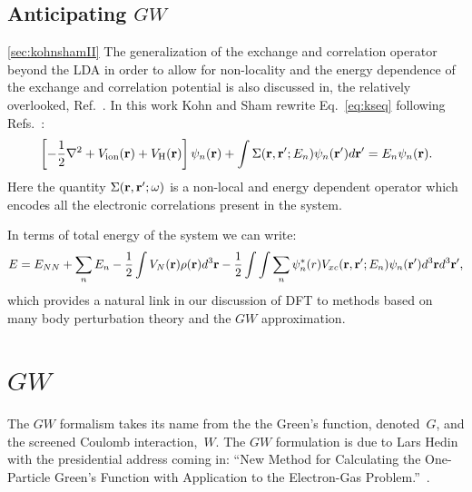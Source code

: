 \subsection{Anticipating $GW$}
\ref{sec:kohnshamII}
The generalization of the exchange and correlation operator beyond the LDA 
in order to allow for non-locality and the energy dependence of the exchange and
correlation potential is also discussed in, the relatively overlooked, Ref.~\cite{shamkohn66}. 
In this work Kohn and Sham rewrite Eq.~\ref{eq:kseq} following Refs.~\cite{schwinger51, hedin65}:
%
\begin{equation}
\label{eq:qpeq}
\left[-\frac{1}{2}\nabla^{2} + V_{\rm{ion}}({\bf r}) + V_{\rm{H}}({\bf r})\right]\psi_{n}({\bf r}) + \int \Sigma({\bf r},{\bf r}';E_{n})\psi_{n}({\bf r}') d{\bf r}' = E_{n}\psi_{n}({\bf r}).
\end{equation}
%
Here the quantity $\Sigma({\bf r},{\bf r}';\omega)$ is a non-local and energy dependent
operator which encodes all the electronic correlations present in the system. 

In terms of total energy of the system we can write:
%
\begin{equation}
\label{eq:shamschlut}
E = E_{NN} + \sum_{n} E_{n} - \frac{1}{2}\int V_{N}({\bf r})\rho({\bf r})d^{3}{\bf r}
-\frac{1}{2}\int\int\sum_{n} \psi_{n}^{*}(r)V_{xc}({\bf r},{\bf r}';E_{n})\psi_{n}({\bf r}')d^{3}{\bf r} d^{3}{\bf r}',
\end{equation}
%
which provides a natural link in our discussion of DFT to methods
based on many body perturbation theory \cite{shamschlut83} and the $GW$
approximation.


\section{$GW$}
\label{sec:GW}
The $GW$ formalism takes its name from the the Green's function, denoted~$G$, and the 
screened Coulomb interaction,~$W$\cite{hedin65}. The $GW$ formulation is due
to Lars Hedin with the presidential address coming in:
``New Method for Calculating the One-Particle Green's Function
with Application to the Electron-Gas Problem.''~\cite{hedin65}. 

